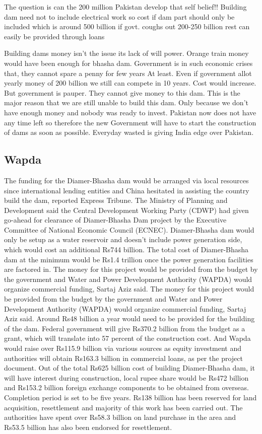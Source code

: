 \documentclass[11pt, journal,letterpaper,compsoc]{IEEEtran}
\begin{document}
The question is can the 200 million Pakistan develop that self belief!!
Building dam need not to include electrical work so cost if dam part should only be included which is around 500 billion if govt. coughs out 200-250 billion rest can easily be provided through loans 

Building dams money isn’t the issue its lack of will power. Orange train money would have been enough for bhasha dam. Government is in such economic crises that, they cannot spare a penny for few years At least. 
Even if government allot yearly money of 200 billion we still can compete in 10 years. Cost would increase. 
But government is pauper. They cannot give money to this dam. This is the major reason that we are still unable to build this dam. Only because we don't have enough money and nobody was ready to invest. Pakistan now does not have any time left so therefore the new Government will have to start the construction of dams as soon as possible. Everyday wasted is giving India edge over Pakistan.


\subsection{Wapda}
The funding for the Diamer-Bhasha dam would be arranged via local resources since international lending entities and China hesitated in assisting the country build the dam, reported Express Tribune. The Ministry of Planning and Development said the Central Development Working Party (CDWP) had given go-ahead for clearance of Diamer-Bhasha Dam project by the Executive Committee of National Economic Council (ECNEC). Diamer-Bhasha dam would only be setup as a water reservoir and doesn’t include power generation side, which would cost an additional Rs744 billion. The total cost of Diamer-Bhasha dam at the minimum would be Rs1.4 trillion once the power generation facilities are factored in. The money for this project would be provided from the budget by the government and Water and Power Development Authority (WAPDA) would organize commercial funding, Sartaj Aziz said. The money for this project would be provided from the budget by the government and Water and Power Development Authority (WAPDA) would organize commercial funding, Sartaj Aziz said. Around Rs48 billion a year would need to be provided for the building of the dam. Federal government will give Rs370.2 billion from the budget as a grant, which will translate into 57 percent of the construction cost. And Wapda would raise over Rs115.9 billion via various sources as equity investment and authorities will obtain Rs163.3 billion in commercial loans, as per the project document. Out of the total Rs625 billion cost of building Diamer-Bhasha dam, it will have interest during construction, local rupee share would be Rs472 billion and Rs153.2 billion foreign exchange components to be obtained from overseas. Completion period is set to be five years. Rs138 billion has been reserved for land acquisition, resettlement and majority of this work has been carried out. The authorities have spent over Rs58.3 billion on land purchase in the area and Rs53.5 billion has also been endorsed for resettlement.
\end{document}
